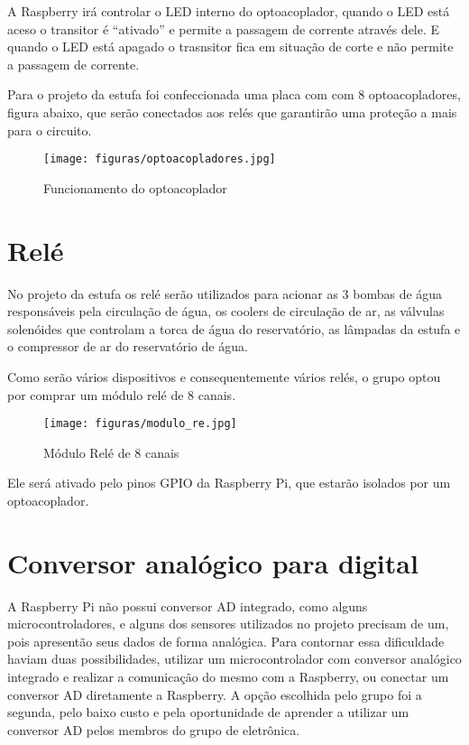 A Raspberry irá controlar o LED interno do optoacoplador, quando o LED está aceso o transitor é “ativado” e permite a passagem de corrente através dele. E quando o LED está apagado o trasnsitor fica em situação de corte e não permite a passagem de corrente.

Para o projeto da estufa foi confeccionada uma placa com com 8 optoacopladores, figura abaixo, que serão conectados aos relés que garantirão uma proteção a mais para o circuito\cite{vishay}.


\begin{figure}[H]
	\centering
	\texttt{[image: figuras/optoacopladores.jpg]}
	\caption{Funcionamento do optoacoplador} \label{optoacopladores}
\end{figure}

\section{Relé}

No projeto da estufa os relé serão utilizados para acionar as 3 bombas de água responsáveis pela circulação de água, os coolers de circulação de ar, as válvulas solenóides que controlam a torca de água do reservatório, as lâmpadas da estufa e o compressor de ar do reservatório de água.

Como serão vários dispositivos e consequentemente vários relés, o grupo optou por comprar um módulo relé de 8 canais\cite{braga2012}.

\begin{figure}[H]
	\centering
	\texttt{[image: figuras/modulo\_re.jpg]}
	\caption{Módulo Relé de 8 canais} \label{modulo_re}
\end{figure}

Ele será ativado pelo pinos GPIO da Raspberry Pi, que estarão isolados por um optoacoplador.

\section{Conversor analógico para digital}

A Raspberry Pi não possui conversor AD integrado, como alguns microcontroladores, e alguns dos sensores utilizados no projeto precisam de um, pois apresentão seus dados de forma analógica. Para contornar essa dificuldade haviam duas possibilidades, utilizar um microcontrolador com conversor analógico integrado e realizar a comunicação do mesmo com a Raspberry, ou conectar um conversor AD diretamente a Raspberry. A opção escolhida pelo grupo foi a segunda, pelo baixo custo e pela oportunidade de aprender a utilizar um conversor AD pelos membros do grupo de eletrônica\cite{nxp2013}.
 
